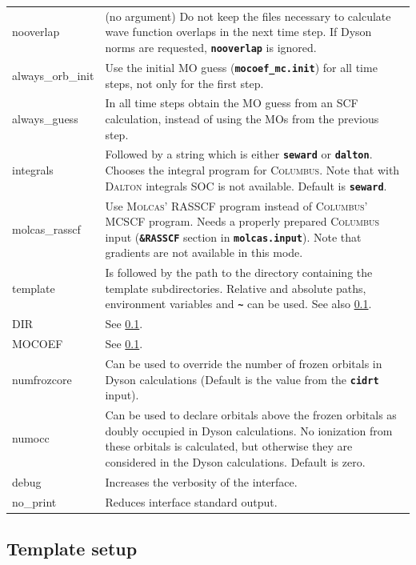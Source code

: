 \documentclass[a4paper,10pt,DIV=15,openany]{scrbook}
\newcommand{\ttt}[1]{\textbf{\texttt{#1}}}
\begin{document}
\begin{longtable}{>{\ttfamily}lp{12cm}}
nooverlap       &(no argument) Do not keep the files necessary to calculate wave function overlaps in the next time step. If Dyson norms are requested, \ttt{nooverlap} is ignored.\\
always\_orb\_init    &Use the initial MO guess (\ttt{mocoef\_mc.init}) for all time steps, not only for the first step.\\
always\_guess     &In all time steps obtain the MO guess from an SCF calculation, instead of using the MOs from the previous step.\\
integrals       &Followed by a string which is either \ttt{seward} or \ttt{dalton}. Chooses the integral program for \textsc{Columbus}. Note that with \textsc{Dalton} integrals SOC is not available. Default is \ttt{seward}.\\
molcas\_rasscf  &Use \textsc{Molcas}' RASSCF program instead of \textsc{Columbus}' MCSCF program. Needs a properly prepared \textsc{Columbus} input (\ttt{\&RASSCF} section in \ttt{molcas.input}). Note that gradients are not available in this mode.\\
template        &Is followed by the path to the directory containing the template subdirectories. Relative and absolute paths, environment variables and \ttt{\textasciitilde} can be used. See also \ref{int:col:template}.\\
DIR             &See \ref{int:col:template}.\\
MOCOEF          &See \ref{int:col:template}.\\
numfrozcore           &Can be used to override the number of frozen orbitals in Dyson calculations (Default is the value from the \ttt{cidrt} input).\\
numocc           &Can be used to declare orbitals above the frozen orbitals as doubly occupied in Dyson calculations. No ionization from these orbitals is calculated, but otherwise they are considered in the Dyson calculations. Default is zero.\\
  debug           &Increases the verbosity of the interface.\\
  no\_print       &Reduces interface standard output.\\
\end{longtable}



\subsection{Template setup}\label{int:col:template}
\end{document}
